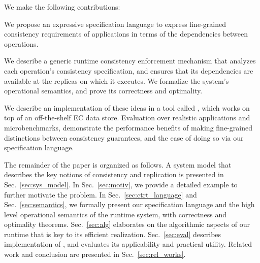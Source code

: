 We make the following contributions:
\begin{enumerate*}[label=(\roman*)]  
\item We propose an expressive specification language to express
  fine-grained consistency requirements of applications in terms of
  the dependencies between operations.

\item We describe a generic runtime consistency enforcement mechanism
  that analyzes each operation's consistency specification, and
  ensures that its dependencies are available at the replicas on which
  it executes.  We formalize the system's operational semantics, and
  prove its correctness and optimality.
    
  \item We describe an implementation of these ideas in a tool called
    \tool, which works on top of an off-the-shelf EC data store.
    Evaluation over realistic applications and microbenchmarks,
    demonstrate the performance benefits of making fine-grained
    distinctions between consistency guarantees, and the ease of doing
    so via our specification language.

\end{enumerate*}

The remainder of the paper is organized as follows.  A system model
that describes the key notions of consistency and replication is
presented in Sec.~\ref{sec:sys_model}.  In Sec.~\ref{sec:motiv}, we
provide a detailed example to further motivate the problem.  In
Sec.~\ref{sec:ctrt_language} and Sec.~\ref{sec:semantics}, we formally
present our specification language and the high level operational
semantics of the runtime system, with correctness and optimality
theorems.  Sec.~\ref{sec:alg} elaborates on the algorithmic aspects of
our runtime that is key to its efficient
realization. Sec.~\ref{sec:eval} describes implementation of \tool,
and evaluates its applicability and practical utility.  Related work
and conclusion are presented in Sec.~\ref{sec:rel_works}.








